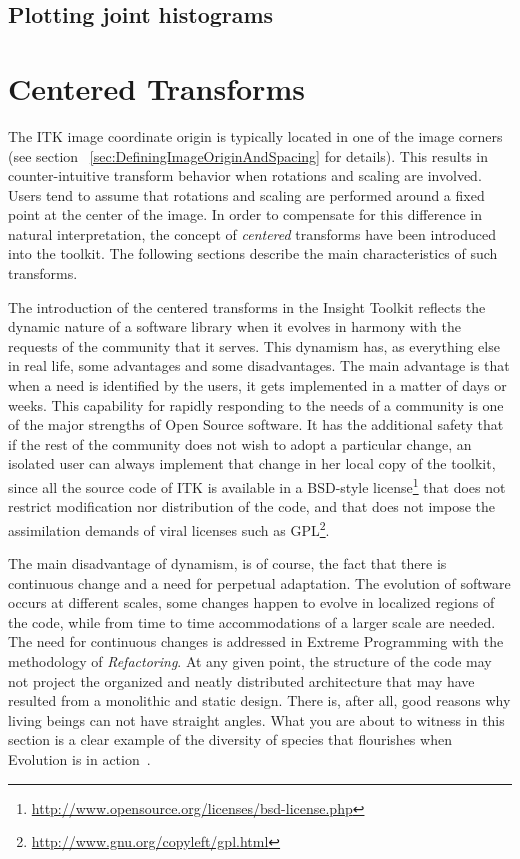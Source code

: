 \subsection{Plotting joint histograms}
\label{sec:JointHistograms}
\ifitkFullVersion

\fi


\section{ Centered Transforms }

The ITK image coordinate origin is typically located in one of the image
corners (see section ~\ref{sec:DefiningImageOriginAndSpacing} for details).
This results in counter-intuitive transform behavior when rotations and scaling
are involved. Users tend to assume that rotations and scaling are performed
around a fixed point at the center of the image.  In order to compensate for
this difference in natural interpretation, the concept of \emph{centered}
transforms have been introduced into the toolkit. The following sections
describe the main characteristics of such transforms.

The introduction of the centered transforms in the Insight Toolkit reflects the
dynamic nature of a software library when it evolves in harmony with the
requests of the community that it serves. This dynamism has, as everything else
in real life, some advantages and some disadvantages. The main advantage is that
when a need is identified by the users, it gets implemented in a matter of days
or weeks.  This capability for rapidly responding to the needs of a community
is one of the major strengths of Open Source software. It has the additional
safety that if the rest of the community does not wish to adopt a particular
change, an isolated user can always implement that change in her local copy of
the toolkit, since all the source code of ITK is available in a BSD-style
license\footnote{\url{http://www.opensource.org/licenses/bsd-license.php}} that
does not restrict modification nor distribution of the code, and that does not
impose the assimilation demands of viral licenses such as
GPL\footnote{\url{http://www.gnu.org/copyleft/gpl.html}}.

The main disadvantage of dynamism, is of course, the fact that there is
continuous change and a need for perpetual adaptation. The evolution of
software occurs at different scales, some changes happen to evolve in localized
regions of the code, while from time to time accommodations of a larger scale
are needed. The need for continuous changes is addressed in Extreme Programming
with the methodology of \emph{Refactoring}. At any given point, the structure
of the code may not project the organized and neatly distributed architecture
that may have resulted from a monolithic and static design. There is, after
all, good reasons why living beings can not have straight angles. What you are
about to witness in this section is a clear example of the diversity of species
that flourishes when Evolution is in action~\cite{Darwin1999}.


